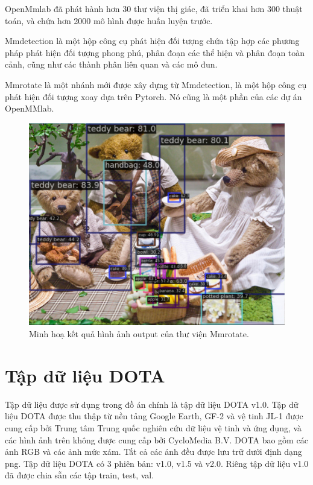 \documentclass[12pt,a4paper,openany,oneside]{report}
\begin{document}
OpenMmlab đã phát hành hơn 30 thư viện thị giác, đã triển khai hơn 300 thuật toán, và chứa hơn 2000 mô hình được huấn luyện trước.

Mmdetection là một hộp công cụ phát hiện đối tượng chứa tập hợp các phương pháp phát hiện đối tượng phong phú, phân đoạn các thể hiện và phân đoạn toàn cảnh, cũng như các thành phân liên quan và các mô đun.

Mmrotate là một nhánh mới được xây dựng từ Mmdetection, là một hộp công cụ phát hiện đối tượng xoay dựa trên Pytorch. Nó cũng là một phần của các dự án OpenMMlab.
\begin{figure}[ht!]
	\begin{center}
		\includegraphics[width=445px]{./demo_mmrotate_result.jpg}
		\caption{Minh hoạ kết quả hình ảnh output của thư viện Mmrotate.}
		\label{demo_mmrotate_result}
	\end{center}
\end{figure} 

\section{Tập dữ liệu DOTA} 

Tập dữ liệu được sử dụng trong đồ án chính là tập dữ liệu DOTA v1.0. Tập dữ liệu DOTA được thu thập từ nền tảng Google Earth, GF-2 và vệ tinh JL-1 được cung cấp bởi Trung tâm Trung quốc nghiên cứu dữ liệu vệ tinh và ứng dụng, và các hình ảnh trên không được cung cấp bởi CycloMedia B.V. DOTA bao gồm các ảnh RGB và các ảnh mức xám. Tất cả các ảnh đều được lưu trữ dưới định dạng png. Tập dữ liệu DOTA có 3 phiên bản: v1.0, v1.5 và v2.0. Riêng tập dữ liệu v1.0 đã được chia sẵn các tập train, test, val.
\end{document}

